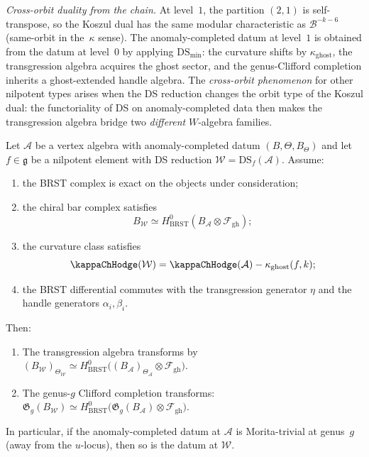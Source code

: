 \begin{construction}
\emph{Cross-orbit duality from the chain.}
At level~$1$, the partition $(2,1)$ is self-transpose, so
the Koszul dual has the same modular characteristic as
$\mathcal B^{-k-6}$ (same-orbit in the~$\kappa$ sense). The
anomaly-completed datum at level~$1$ is obtained from the
datum at level~$0$ by applying
$\mathrm{DS}_{\min}$: the curvature shifts by
$\kappa_{\mathrm{ghost}}$, the transgression algebra
acquires the ghost sector, and the genus-Clifford completion
inherits a ghost-extended handle algebra. The
\emph{cross-orbit phenomenon} for other nilpotent types arises
when the DS reduction changes the orbit type of the Koszul
dual: the functoriality of DS on anomaly-completed data
then makes the transgression algebra bridge two
\emph{different} $W$-algebra families.
\end{construction}

\begin{theorem}
\label{thm:ds-anomaly-functoriality}
Let $\mathcal A$ be a vertex algebra with anomaly-completed
datum $(B,\Theta,B_\Theta)$ and let $f\in\mathfrak g$ be a
nilpotent element with DS reduction
$\mathcal W=\mathrm{DS}_f(\mathcal A)$.  Assume:
\begin{enumerate}[label=\textup{(\alph*)}]
\item the BRST complex is exact on the objects under consideration;
\item the chiral bar complex satisfies
\[
B_{\mathcal W}\simeq
H^0_{\mathrm{BRST}}(B_{\mathcal A}\otimes\mathcal F_{\mathrm{gh}});
\]
\item the curvature class satisfies
\[
\kappaChHodge(\mathcal W)=\kappaChHodge(\mathcal A)-\kappa_{\mathrm{ghost}}(f,k);
\]
\item the BRST differential commutes with the transgression generator
\(\eta\) and the handle generators \(\alpha_i,\beta_i\).
\end{enumerate}
Then:
\begin{enumerate}[label=\textup{(\roman*)}]
\item The transgression algebra transforms by
 $(B_{\mathcal W})_{\Theta_{\mathcal W}}
 \simeq
 H^0_{\mathrm{BRST}}\bigl(
 (B_{\mathcal A})_{\Theta_{\mathcal A}}
 \otimes\mathcal F_{\mathrm{gh}}
 \bigr)$.
\item The genus-$g$ Clifford completion transforms:
 $\mathfrak G_g(B_{\mathcal W})
 \simeq
 H^0_{\mathrm{BRST}}\bigl(
 \mathfrak G_g(B_{\mathcal A})
 \otimes\mathcal F_{\mathrm{gh}}
 \bigr)$.
\end{enumerate}
In particular, if the anomaly-completed datum at
$\mathcal A$ is Morita-trivial at genus~$g$ (away from the
$u$-locus), then so is the datum at $\mathcal W$.
\end{theorem}

